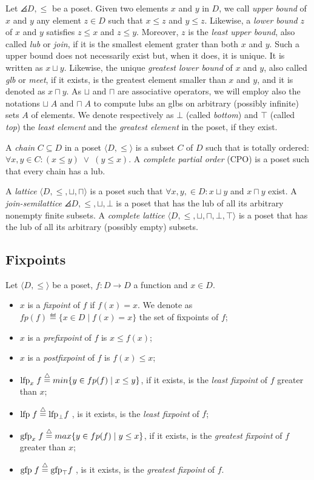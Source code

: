 Let $\angles{D,\leq}$ be a poset.
Given two elements $x$ and $y$ in $D$, we call \emph{upper bound} of $x$ and
$y$ any element $z \in D$ such that $x \leq z$ and $y \leq z$.
Likewise, a \emph{lower bound} $z$ of $x$ and $y$ satisfies $z \leq x$ and
$z \leq y$.
Moreover, $z$ is the \emph{least upper bound}, also called \emph{lub} or \emph{join},
if it is the smallest element grater than both $x$ and $y$.
Such a upper bound does not necessarily exist but, when it does,
it is unique.
It is written as $x \sqcup y$.
Likewise, the unique \emph{greatest lower bound} of $x$ and $y$, also called
\emph{glb} or \emph{meet}, if it exists, is the greatest element smaller than
$x$ and $y$, and it is denoted as $x \sqcap y$.
As $\sqcup$ and $\sqcap$ are associative operators, we will employ also the
notations $\sqcup \; A$ and $\sqcap \; A$
to compute lubs an glbs on arbitrary (possibly infinite) sets $A$ of elements.
We denote respectively as $\bot$ (called \emph{bottom}) and $\top$ (called \emph{top})
the \emph{least element} and the \emph{greatest element} in the poset, if they exist.

A \emph{chain} $C \subseteq D$ in a poset $\langle D, \leq \rangle$ is a subset
$C$ of $D$ such that is totally ordered:
$\forall x,y \in C: (x \leq y) \; \vee \; (y \leq x)$.
A \emph{complete partial order} (CPO) is a poset such that every chain has a lub.

A \emph{lattice} $\langle D, \leq, \sqcup, \sqcap \rangle$ is a poset such that
$\forall x,y, \in D: x \sqcup y$ and $x \sqcap y$ exist.
A \emph{join-semilattice} $\angles{D, \leq, \sqcup, \bot}$ is a poset that
has the lub of all its arbitrary nonempty finite subsets.
A \emph{complete lattice} $\langle D, \leq, \sqcup, \sqcap, \bot, \top \rangle$
is a poset that has the lub of all its arbitrary
(possibly empty) subsets.

\subsection{Fixpoints}

Let $\langle D, \leq \rangle$ be a poset, $f : D \rightarrow D$ a function
and $x \in D$.
\begin{itemize}
\item  $x$ is a \emph{fixpoint} of $f$ if $f(x) = x$.
We denote as $fp(f) \eqdef \{x \in D \;|\; f(x) = x\}$ the set of fixpoints of $f$;
\item $x$ is a \emph{prefixpoint} of $f$ is $x \leq f(x)$;
\item $x$ is a \emph{postfixpoint} of $f$ is $f(x) \leq x$;
\item $\textrm{lfp}_x\; f \overset{\triangle}{=} min \{ y \in fp(f) \;|\; x \leq y\}$, if it exists, is the
\emph{least fixpoint} of $f$ greater than $x$;
\item $\textrm{lfp}\; f \overset{\triangle}{=} \textrm{lfp}_\bot f\;$, is it exists, is the \emph{least fixpoint} of $f$;
\item $\textrm{gfp}_x\; f \overset{\triangle}{=} max \{ y \in fp(f) \;|\; y \leq x\}$, if it exists, is the
\emph{greatest fixpoint} of $f$ greater than $x$;
\item $\textrm{gfp}\; f \overset{\triangle}{=} \textrm{gfp}_\top f\;$, is it exists, is the \emph{greatest fixpoint} of $f$.
\end{itemize}

